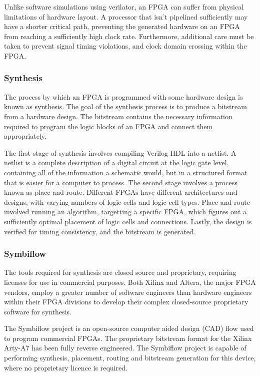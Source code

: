 \documentclass[a4paper,8pt]{report}
\begin{document}
Unlike software simulations using verilator, an
FPGA can suffer from physical limitations of hardware layout. A processor that
isn't pipelined sufficiently may have a shorter critical path, preventing the
generated hardware on an FPGA from reaching a sufficiently high clock rate.
Furthermore, additional care must be taken to prevent signal timing violations,
and clock domain crossing within the FPGA.




\subsubsection{Synthesis}
The process by which an FPGA is programmed with some hardware design is known
as synthesis. The goal of the synthesis process is to produce a bitstream from a
hardware design. The bitstream contains the necessary information required to
program the logic blocks of an FPGA and connect them appropriately.

The first stage of synthesis involves compiling Verilog HDL into a netlist.
A netlist is a complete description of a digital circuit at the logic gate
level, containing all of the information a schematic would, but in a structured
format that is easier for a computer to process.
The second stage involves a process known as place and route. Different FPGAs
have different architectures and designs, with varying numbers of logic cells
and logic cell types. Place and route involved running an algorithm, targetting
a specific FPGA, which figures out a sufficiently optimal placement of logic
cells and connections. Lastly, the design is verified for timing consistency,
and the bitstream is generated.

\subsubsection{Symbiflow}
The tools required for synthesis are closed source and proprietary, requiring
licenses for use in commercial purposes. Both Xilinx and Altera, the major FPGA
vendors, employ a greater number of software engineers than hardware engineers
within their FPGA divisions to develop their complex closed-source proprietary
software for synthesis.

The Symbiflow project is an open-source computer aided design (CAD) flow used to
program commercial FPGAs. The proprietary bitstream format for the Xilinx
Arty-A7 has been fully reverse engineered.
The Symbiflow project is capable of performing synthesis, placement, routing
and bitstream generation for this device, where no proprietary licence is required. 
\end{document}
